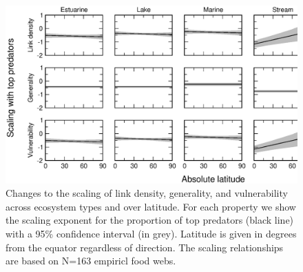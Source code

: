\documentclass[12pt]{article}
\begin{document}
\begin{figure}[!h]
\centerline{\includegraphics*[width=.8\textwidth]{Figures/by_TL/marginal/T_marginal_latitude_proportions.eps}}
\caption{Changes to the scaling of link density, generality, and vulnerability across ecosystem
types and over latitude. For each property we show the scaling exponent for the proportion of
top predators (black line) with a 95\% confidence interval (in grey). Latitude is given in degrees
from the equator regardless of direction. The scaling relationships are based on N=163 empiricl food webs.}
\label{T}
\end{figure}


\newpage


\end{document}

